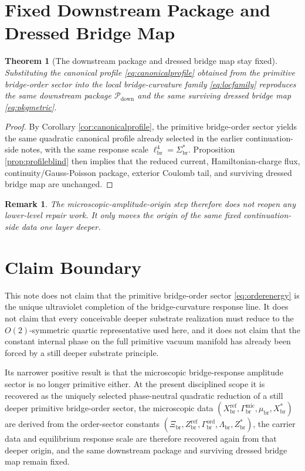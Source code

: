 \documentclass[11pt]{article}
\newcommand{\CurvScale}{\ell_{\mathrm{br}}}
\newcommand{\DownPkg}{\mathscr P_{\mathrm{down}}}
\newcommand{\RespSusEq}{\Sigma_{\mathrm{br}}^{\ast}}
\newcommand{\RespMicroEq}{X_{\mathrm{br}}^{\ast}}
\newcommand{\RespMicroRef}{X_{\mathrm{br}}^{\mathrm{ref}}}
\newcommand{\RespMicroFluxCoeff}{\Gamma_{\mathrm{br}}^{\mathrm{mic}}}
\newcommand{\RespMicroGap}{\mu_{\mathrm{br}}}
\newcommand{\RespOrderRef}{Z_{\mathrm{br}}^{\mathrm{ref}}}
\newcommand{\RespOrderEq}{Z_{\mathrm{br}}^{\ast}}
\newcommand{\RespOrderReadout}{\Xi_{\mathrm{br}}}
\newcommand{\RespOrderStiff}{\Gamma_{\mathrm{br}}^{\mathrm{ord}}}
\newcommand{\RespOrderQuartic}{\Lambda_{\mathrm{br}}}
\newtheorem{remark}{Remark}
\newtheorem{theorem}{Theorem}
\begin{document}
\section{Fixed Downstream Package and Dressed Bridge Map}

\begin{theorem}[The downstream package and dressed bridge map stay fixed]
\label{thm:fixedpackage}
Substituting the canonical profile \eqref{eq:canonicalprofile} obtained from the primitive bridge-order sector into the local bridge-curvature family \eqref{eq:locfamily} reproduces the same downstream package \(\DownPkg\) and the same surviving dressed bridge map \eqref{eq:pkgmetric}.
\end{theorem}

\begin{proof}
By Corollary \ref{cor:canonicalprofile}, the primitive bridge-order sector yields the same quadratic canonical profile already selected in the earlier continuation-side notes, with the same response scale \(\CurvScale^4=\RespSusEq\). Proposition \ref{prop:profileblind} then implies that the reduced current, Hamiltonian-charge flux, continuity/Gauss-Poisson package, exterior Coulomb tail, and surviving dressed bridge map are unchanged.
\end{proof}

\begin{remark}
The microscopic-amplitude-origin step therefore does not reopen any lower-level repair work. It only moves the origin of the same fixed continuation-side data one layer deeper.
\end{remark}

\section{Claim Boundary}

This note does not claim that the primitive bridge-order sector \eqref{eq:orderenergy} is the unique ultraviolet completion of the bridge-curvature response line. It does not claim that every conceivable deeper substrate realization must reduce to the \(O(2)\)-symmetric quartic representative used here, and it does not claim that the constant internal phase on the full primitive vacuum manifold has already been forced by a still deeper substrate principle.

Its narrower positive result is that the microscopic bridge-response amplitude sector is no longer primitive either. At the present disciplined scope it is recovered as the uniquely selected phase-neutral quadratic reduction of a still deeper primitive bridge-order sector, the microscopic data \((\RespMicroRef,\RespMicroFluxCoeff,\RespMicroGap,\RespMicroEq)\) are derived from the order-sector constants \((\RespOrderReadout,\RespOrderRef,\RespOrderStiff,\RespOrderQuartic,\RespOrderEq)\), the carrier data and equilibrium response scale are therefore recovered again from that deeper origin, and the same downstream package and surviving dressed bridge map remain fixed.
\end{document}
